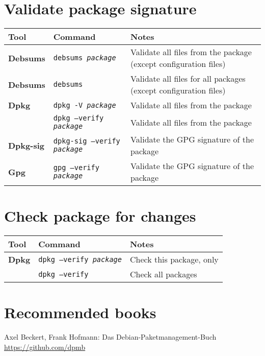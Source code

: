 \documentclass[10pt]{article}
\begin{document}
\section{Validate package signature}
\begin{tabular}{ p{3.5cm} p{9cm} p{11cm}}
  \hline
  \rowcolor{Gray}
  \textbf{Tool} & \textbf{Command} & \textbf{Notes} \\
  \hline 
  \textbf{Debsums} & \texttt{debsums \textit{package}} & Validate all files from the package (except configuration files)\\
  \rowcolor{Gray}
  \textbf{Debsums} & \texttt{debsums} & Validate all files for all packages (except configuration files) \\
  \textbf{Dpkg} & \texttt{dpkg -V \textit{package}} & Validate all files from the package \\
  \rowcolor{Gray}
  & \texttt{dpkg --verify \textit{package}} & Validate all files from the package \\
  \textbf{Dpkg-sig} & \texttt{dpkg-sig --verify \textit{package}} & Validate the GPG signature of the package \\
  \rowcolor{Gray}
  \textbf{Gpg} & \texttt{gpg --verify \textit{package}} & Validate the GPG signature of the package \\
  \hline
\end{tabular}

\section{Check package for changes}
\begin{tabular}{ p{3.5cm} p{9cm} p{11cm}}
  \hline
  \rowcolor{Gray}
  \textbf{Tool} & \textbf{Command} & \textbf{Notes} \\
  \hline 
  \textbf{Dpkg} & \texttt{dpkg --verify \textit{package}} & Check this package, only \\
  \rowcolor{Gray}
  & \texttt{dpkg --verify} & Check all packages \\
  \hline
\end{tabular}

\section*{Recommended books}

\noindent Axel Beckert, Frank Hofmann: Das Debian-Paketmanagement-Buch \\  \href{https://github.com/dpmb}{https://github.com/dpmb}
\end{document}
